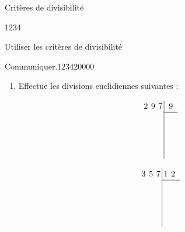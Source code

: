 \begin{pageCours}
\begin{minipage}{0.6\linewidth}
\begin{ThT}{Critères de divisibilité}
\end{ThT}
\end{minipage}
\begin{minipage}{0.4\linewidth}
\begin{MeQr}{1234}

Utiliser les critères de divisibilité
\end{MeQr}
\end{minipage}






\end{pageCours} 
\begin{pageAD} 
 

 
  
\begin{ExoCad}{Communiquer.}{1234}{2}{0}{0}{0}{0}

\begin{enumerate}

\item Effectue les divisions euclidiennes suivantes :


\begin{minipage}{0.3\linewidth}
\begin{equation*}
\renewcommand{\arraystretch}{1.2}
\renewcommand{\arraycolsep}{2pt}
  \begin{array}{rrrr|rrr}
 & 2  & 9 & 7 & & 9 \\
\cline{5-7}
 & &  &  &  & \\
    & &  &  &   &   &  \\
    &  &  &  &   &   &  \\
    &&  &  &   &   &  \\
  \end{array}
\end{equation*}
\end{minipage}
\begin{minipage}{0.3\linewidth}
\begin{equation*}
\renewcommand{\arraystretch}{1.2}
\renewcommand{\arraycolsep}{2pt}
  \begin{array}{rrrr|rrr}
 & 3  & 5 & 7 &  1 & 2 \\
\cline{5-7}
 & &  &  &  & \\
    & &  &  &   &   &  \\
    &  &  &  &   &   &  \\
    &&  &  &   &   &  \\
  \end{array}
\end{equation*}


\end{minipage}
\end{enumerate}
\end{ExoCad}
\end{pageAD}
